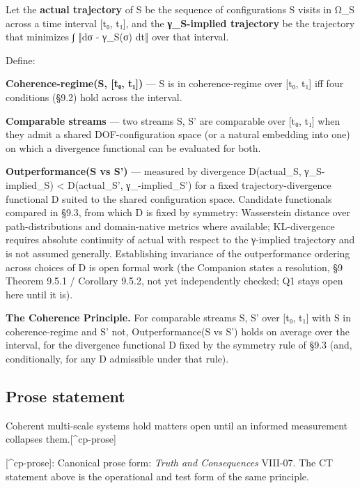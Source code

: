 \documentclass[11pt, openany]{book}
\renewenvironment{quote}{\begin{quoting}}{\end{quoting}}
\begin{document}
Let the \textbf{actual trajectory} of S be the sequence of configurations S visits in Ω\_\allowbreak{}S across a time interval [t₀, t₁], and the \textbf{γ\_\allowbreak{}S-implied trajectory} be the trajectory that minimizes ∫ ‖dσ - γ\_\allowbreak{}S(σ) dt‖ over that interval.

Define:

\begin{quote}
\textbf{Coherence-regime(S, [t₀, t₁])} --- S is in coherence-regime over [t₀, t₁] iff four conditions (§9.2) hold across the interval.

\textbf{Comparable streams} --- two streams S, S' are comparable over [t₀, t₁] when they admit a shared DOF-configuration space (or a natural embedding into one) on which a divergence functional can be evaluated for both.

\textbf{Outperformance(S vs S')} --- measured by divergence D(actual\_\allowbreak{}S, γ\_\allowbreak{}S-implied\_\allowbreak{}S) < D(actual\_\allowbreak{}S', γ\_-implied\_\allowbreak{}S') for a fixed trajectory-divergence functional D suited to the shared configuration space. Candidate functionals compared in §9.3, from which D is fixed by symmetry: Wasserstein distance over path-distributions and domain-native metrics where available; KL-divergence requires absolute continuity of actual with respect to the γ-implied trajectory and is not assumed generally. Establishing invariance of the outperformance ordering across choices of D is open formal work (the Companion states a resolution, §9 Theorem 9.5.1 / Corollary 9.5.2, not yet independently checked; Q1 stays open here until it is).
\end{quote}

\textbf{The Coherence Principle.} For comparable streams S, S' over [t₀, t₁] with S in coherence-regime and S' not, Outperformance(S vs S') holds on average over the interval, for the divergence functional D fixed by the symmetry rule of §9.3 (and, conditionally, for any D admissible under that rule).

\subsection{Prose statement}

Coherent multi-scale systems hold matters open until an informed measurement collapses them.[\textasciicircum{}cp-prose]

[\textasciicircum{}cp-prose]: Canonical prose form: \textit{Truth and Consequences} VIII-07. The CT statement above is the operational and test form of the same principle.
\end{document}
